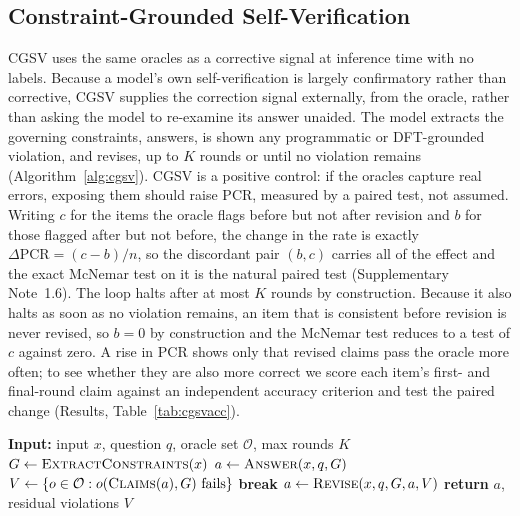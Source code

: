 \documentclass[pdflatex,sn-nature]{sn-jnl}
\newcommand{\rev}[1]{#1}
\newcommand{\rev}[1]{{\color{blue}#1}}
\begin{document}
\subsection*{Constraint-Grounded Self-Verification}
CGSV uses the same oracles as a corrective signal at inference time with no labels.
Because a model's own self-verification is largely confirmatory rather than
corrective,\cite{selfverify2026} CGSV supplies the correction signal externally, from the
oracle, rather than asking the model to re-examine its answer unaided. The model extracts
the governing constraints, answers, is shown any programmatic or DFT-grounded violation,
and revises, up to $K$ rounds or until no violation remains (Algorithm~\ref{alg:cgsv}).
CGSV is a positive control: if the oracles capture real errors, exposing them should raise
PCR, measured by a paired test, not assumed. Writing $c$ for the items the oracle flags
before but not after revision and $b$ for those flagged after but not before, the change in
the rate is exactly $\Delta\mathrm{PCR}=(c-b)/n$, so the discordant pair $(b,c)$ carries all
of the effect and the exact McNemar test on it is the natural paired test
(Supplementary Note~1.6). The loop halts after at most $K$ rounds by construction. \rev{Because it
also halts as soon as no violation remains, an item that is consistent before revision is never
revised, so $b=0$ by construction and the McNemar test reduces to a test of $c$ against zero. A rise
in PCR shows only that revised claims pass the oracle more often; to see whether they are also more
correct we score each item's first- and final-round claim against an independent accuracy criterion
and test the paired change (Results, Table~\ref{tab:cgsvacc}).}

\begin{algorithm}[t]
\caption{Constraint-Grounded Self-Verification}
\label{alg:cgsv}
\begin{algorithmic}[1]
\State \textbf{Input:} input $x$, question $q$, oracle set $\mathcal{O}$, max rounds $K$
\State $G \gets \textsc{ExtractConstraints}(x)$
\State $a \gets \textsc{Answer}(x,q,G)$
  \State $V \gets \{o \in \mathcal{O} : o(\textsc{Claims}(a), G)\ \text{fails}\}$
   \State \textbf{break} \EndIf
  \State $a \gets \textsc{Revise}(x, q, G, a, V)$
\EndFor
\State \textbf{return} $a$, residual violations $V$
\end{algorithmic}
\end{algorithm}
\end{document}
